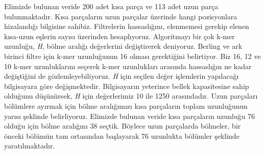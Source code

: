 Elimizde bulunan veride 200 adet kısa parça ve 113 adet uzun parça bulunmaktadır. Kısa parçaların uzun parçalar üzerinde hangi pozisyonlara hizalandığı bilgisine sahibiz. Filtrelerin hassaslığını, elenmemesi gerekip elenen kısa-uzun eşlerin sayısı üzerinden hesaplıyoruz. Algoritmayı bir çok k-mer uzunluğu, \textit{H}, bölme aralığı değerlerini değiştirerek deniyoruz. Berling ve ark \cite{berlin} birinci filtre için k-mer uzunluğunun 16 olması gerektiğini belirtiyor. Biz 16, 12 ve 10 k-mer uzunluklarını seçerek k-mer uzunlukları arasında hassaslığın ne kadar değiştiğini de gözlemleyebiliyoruz. \textit{H} için seçilen değer işlemlerin yapılacağı bilgisayara göre değişmektedir. Bilgisayarın yeterince bellek kapasitesine sahip olduğunu düşünürsek, \textit{H} için değerlerimiz 10 ile 1250 arasındadır. Uzun parçaları bölümlere ayırmak için bölme aralığımızı kısa parçaların toplam uzunluğunun yarısı şeklinde belirliyoruz. Elimizde bulunan veride kısa parçaların uzunluğu 76 olduğu için bölme aralığını 38 seçtik. Böylece uzun parçalarda bölmeler, bir önceki bölümün tam ortasından başlayarak 76 uzunlukta bölümler şeklinde yaratılmaktadır.

